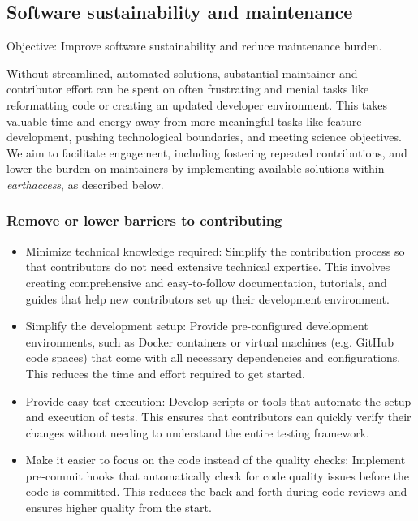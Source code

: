 \documentclass{ROSES-NASA-proposal}
\newcommand{\earthaccess}{\textit{earthaccess}\xspace} %
\begin{document}
\subsection{Software sustainability and maintenance} \label{maintain}

\begin{boxC}
Objective: Improve software sustainability and reduce maintenance burden.
\end{boxC}

Without streamlined, automated solutions, substantial maintainer and contributor effort can be spent on often frustrating and menial tasks like reformatting code or creating an updated developer environment. This takes valuable time and energy away from more meaningful tasks like feature development, pushing technological boundaries, and meeting science objectives. We aim to facilitate engagement, including fostering repeated contributions, and lower the burden on maintainers by implementing available solutions within \earthaccess, as described below.


\subsubsection{Remove or lower barriers to contributing} \label{barriers}

\begin{itemize}[itemsep=-.1em]
    \item Minimize technical knowledge required: Simplify the contribution process so that contributors do not need extensive technical expertise. This involves creating comprehensive and easy-to-follow documentation, tutorials, and guides that help new contributors set up their development environment.
    \item Simplify the development setup: Provide pre-configured development environments, such as Docker containers or virtual machines (e.g. GitHub code spaces) that come with all necessary dependencies and configurations. This reduces the time and effort required to get started.
    \item Provide easy test execution: Develop scripts or tools that automate the setup and execution of tests. This ensures that contributors can quickly verify their changes without needing to understand the entire testing framework.
    \item Make it easier to focus on the code instead of the quality checks: Implement pre-commit hooks that automatically check for code quality issues before the code is committed. This reduces the back-and-forth during code reviews and ensures higher quality from the start.
\end{itemize}
\end{document}
